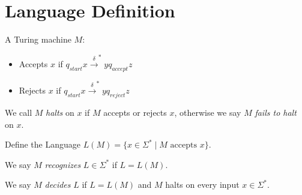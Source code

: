 \section{Language Definition}

\begin{definition}A Turing machine \(M\):
\begin{itemize}
\item
  Accepts \(x\) if
  \(q_{start}x \overset{\delta}{\rightarrow}^* y q_{accept}z\)
\item
  Rejects \(x\) if
  \(q_{start}x \overset{\delta}{\rightarrow}^* y q_{reject}z\)
\end{itemize}
\end{definition}

\begin{definition}[Halts]
We call \(M\) \emph{halts} on \(x\) if $M$ accepts or rejects $x$, otherwise
we say \(M\) \emph{fails to halt} on \(x\).
\end{definition}

\begin{definition}[Language]
Define the Language
\(L(M) = \{x \in \Sigma^* \mid M \text{ accepts } x\}\).

We say \(M\) \emph{recognizes} \(L \in \Sigma^*\) if \(L = L(M)\).

We say \(M\) \emph{decides} \(L\) if \(L = L(M)\) and \(M\) halts on
every input \(x \in \Sigma^*\).
\end{definition}